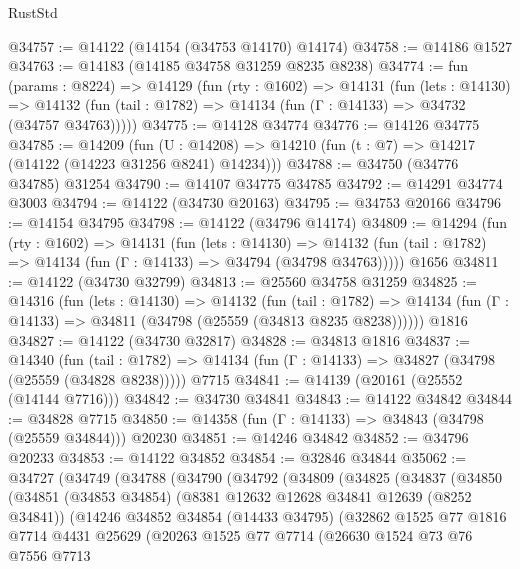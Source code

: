 \begin{lexlean}{RustStd}
\begin{coremodule}
@34757 := @14122 (@14154 (@34753 @14170) @14174)
@34758 := @14186 @1527
@34763 := @14183 (@14185 @34758 @31259 @8235 @8238)
@34774 := fun (params : @8224) =>
  @14129
    (fun (rty : @1602) =>
    @14131
      (fun (lets : @14130) =>
      @14132 (fun (tail : @1782) => @14134 (fun (Γ : @14133) => @34732 (@34757 @34763)))))
@34775 := @14128 @34774
@34776 := @14126 @34775
@34785 := @14209
    (fun (U : @14208) => @14210 (fun (t : @7) => @14217 (@14122 (@14223 @31256 @8241) @14234)))
@34788 := @34750 (@34776 @34785) @31254
@34790 := @14107 @34775 @34785
@34792 := @14291 @34774 @3003
@34794 := @14122 (@34730 @20163)
@34795 := @34753 @20166
@34796 := @14154 @34795
@34798 := @14122 (@34796 @14174)
@34809 := @14294
    (fun (rty : @1602) =>
    @14131
      (fun (lets : @14130) =>
      @14132 (fun (tail : @1782) => @14134 (fun (Γ : @14133) => @34794 (@34798 @34763)))))
    @1656
@34811 := @14122 (@34730 @32799)
@34813 := @25560 @34758 @31259
@34825 := @14316
    (fun (lets : @14130) =>
    @14132
      (fun (tail : @1782) =>
      @14134 (fun (Γ : @14133) => @34811 (@34798 (@25559 (@34813 @8235 @8238))))))
    @1816
@34827 := @14122 (@34730 @32817)
@34828 := @34813 @1816
@34837 := @14340
    (fun (tail : @1782) => @14134 (fun (Γ : @14133) => @34827 (@34798 (@25559 (@34828 @8238)))))
    @7715
@34841 := @14139 (@20161 (@25552 (@14144 @7716)))
@34842 := @34730 @34841
@34843 := @14122 @34842
@34844 := @34828 @7715
@34850 := @14358 (fun (Γ : @14133) => @34843 (@34798 (@25559 @34844))) @20230
@34851 := @14246 @34842
@34852 := @34796 @20233
@34853 := @14122 @34852
@34854 := @32846 @34844
@35062 := @34727
    (@34749
      (@34788
        (@34790
          (@34792
            (@34809
              (@34825
                (@34837
                  (@34850
                    (@34851
                      (@34853 @34854)
                      (@8381 @12632 @12628 @34841 @12639 (@8252 @34841))
                      (@14246
                        @34852
                        @34854
                        (@14433 @34795)
                        (@32862
                          @1525
                          @77
                          @1816
                          @7714
                          @4431
                          @25629
                          (@20263
                            @1525
                            @77
                            @7714
                            (@26630
                              @1524
                              @73
                              @76
                              @7556
                              @7713

\end{coremodule}
\end{lexlean}
